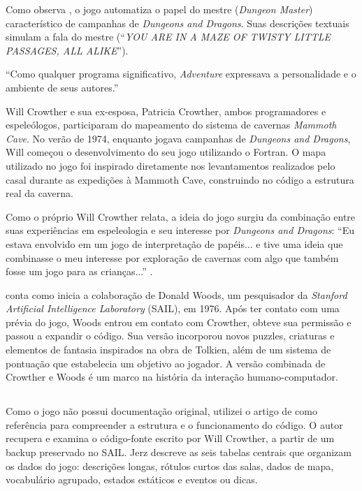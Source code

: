\documentclass[12pt,a4paper]{article}
\begin{document}
Como observa \textcite{dibbell1998mytinylife}, o jogo automatiza o papel do mestre (\textit{Dungeon Master}) característico de campanhas de \textit{Dungeons and Dragons}. Suas descrições textuais simulam a fala do mestre (“\textit{YOU ARE IN A MAZE OF TWISTY LITTLE PASSAGES, ALL ALIKE}”).  

“Como qualquer programa significativo, \textit{Adventure} expressava a personalidade e o ambiente de seus autores.” \textcite{levy2010hackers}

Will Crowther e sua ex-esposa, Patricia Crowther, ambos programadores e espeleólogos, participaram do mapeamento do sistema de cavernas \textit{Mammoth Cave}. No verão de 1974, enquanto jogava campanhas de \textit{Dungeons and Dragons}, Will começou o desenvolvimento do seu jogo utilizando o Fortran. O mapa utilizado no jogo foi inspirado diretamente nos levantamentos realizados pelo casal durante as expedições à Mammoth Cave, construindo no código a estrutura real da caverna.

Como o próprio Will Crowther relata, a ideia do jogo surgiu da combinação entre suas experiências em espeleologia e seu interesse por \textit{Dungeons and Dragons}: “Eu estava envolvido em um jogo de interpretação de papéis... e tive uma ideia que combinasse o meu interesse por exploração de cavernas com algo que também fosse um jogo para as crianças...” \textcite{peterson1983genesis}.

\textcite{levy2010hackers} conta como inicia a colaboração de Donald Woods, um pesquisador da \textit{Stanford Artificial Intelligence Laboratory} (SAIL), em 1976. Após ter contato com uma prévia do jogo, Woods entrou em contato com Crowther, obteve sua permissão e passou a expandir o código. Sua versão incorporou novos puzzles, criaturas e elementos de fantasia inspirados na obra de Tolkien, além de um sistema de pontuação que estabelecia um objetivo ao jogador. A versão combinada de Crowther e Woods é um marco na história da interação humano-computador.

\subsection{}
Como o jogo não possui documentação original, utilizei o artigo de \textcite{jerz2007colossal} como referência para compreender a estrutura e o funcionamento do código. O autor recupera e examina o código-fonte escrito por Will Crowther, a partir de um backup preservado no SAIL. Jerz descreve as seis tabelas centrais que organizam os dados do jogo: descrições longas, rótulos curtos das salas, dados de mapa, vocabulário agrupado, estados estáticos e eventos ou dicas.  
\end{document}
